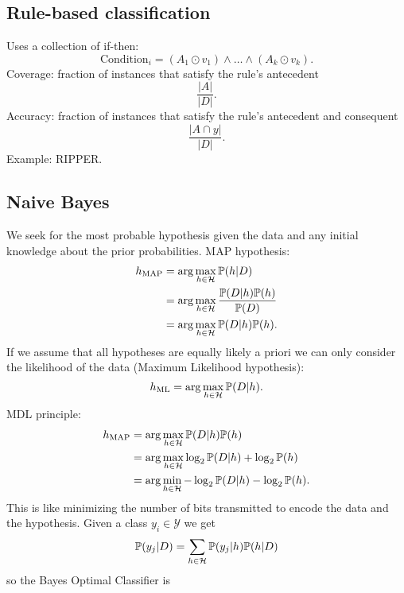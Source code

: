 \documentclass[a4paper,9pt]{extarticle}
\begin{document}
\begin{multicols*}{2}
\subsection{Rule-based classification}
Uses a collection of if-then:
\begin{equation*}
	\text{Condition}_{i}=(A_{1}\odot v_{1})\wedge\ldots\wedge(A_{k}\odot v_{k}).
\end{equation*}
Coverage: fraction of instances that satisfy the rule's antecedent
\begin{equation*}
	\frac{|A|}{|D|}.
\end{equation*}
Accuracy: fraction of instances that satisfy the rule's antecedent and consequent
\begin{equation*}
	\frac{|A\cap y|}{|D|}.
\end{equation*}
Example: RIPPER.
\subsection{Naive Bayes}
We seek for the most probable hypothesis given the data and any initial knowledge about the prior probabilities. MAP hypothesis:
\begin{align*}
	h_{\mathrm{MAP}}&=\arg\max_{h\in\mathcal{H}}\mathbb{P}(h|D)\\
	&=\arg\max_{h\in\mathcal{H}}\frac{\mathbb{P}(D|h)\mathbb{P}(h)}{\mathbb{P}(D)}\\
	&=\arg\max_{h\in\mathcal{H}}\mathbb{P}(D|h)\mathbb{P}(h).
\end{align*}
If we assume that all hypotheses are equally likely a priori we can only consider the likelihood of the data (Maximum Likelihood hypothesis):
\begin{equation*}
	h_{\mathrm{ML}}=\arg\max_{h\in\mathcal{H}}\mathbb{P}(D|h).
\end{equation*}
MDL principle:
\begin{align*}
		h_{\mathrm{MAP}}&=\arg\max_{h\in\mathcal{H}}\mathbb{P}(D|h)\mathbb{P}(h)\\
		&=\arg\max_{h\in\mathcal{H}}\log_{2}\mathbb{P}(D|h)+\log_{2}\mathbb{P}(h)\\
		&=\arg\min_{h\in\mathcal{H}}-\log_{2}\mathbb{P}(D|h)-\log_{2}\mathbb{P}(h).
\end{align*}
This is like minimizing the number of bits transmitted to encode the data and the hypothesis. Given a class $y_{i}\in\mathcal{Y}$ we get
\begin{equation*}
	\mathbb{P}(y_{j}|D)=\sum_{h\in\mathcal{H}}\mathbb{P}(y_{j}|h)\mathbb{P}(h|D)
\end{equation*}
so the Bayes Optimal Classifier is
\begin{equation*}

\end{equation*}
\end{multicols*}
\end{document}
